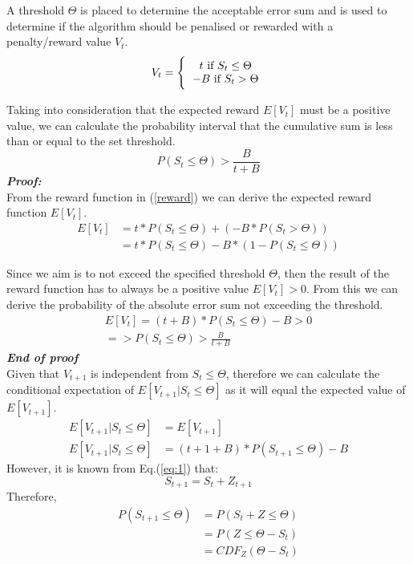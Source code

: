 \documentclass{mpaper}
\begin{document}
A threshold $\Theta$ is placed to determine the acceptable error sum and is used to determine if the algorithm should be penalised or rewarded with a penalty/reward value $V_t$.
\begin{equation}\label{reward}
    V_t = \Bigg\{ \begin{tabular}{c}
                  $t\ \text{if}\ S_t \leq \Theta$ \\
                  $-B\ \text{if}\ S_t > \Theta$
                  \end{tabular}
\end{equation}

Taking into consideration that the expected reward $E[V_t]$ must be a positive value, we can calculate the probability interval that the cumulative sum is less than or equal to the set threshold.
\begin{equation}
    P(S_t \leq \Theta) > \frac{B}{t+B}
\end{equation}
\emph{\textbf{Proof:}} \\
From the reward function in (\ref{reward}) we can derive the expected reward function $E[V_t]$. 
\begin{equation}
\begin{split}
    E[V_t] & = t * P(S_t \leq \Theta) + (-B * P(S_t > \Theta))\\
    & = t * P(S_t \leq \Theta) - B * (1 - P(S_t \leq \Theta))
\end{split}
\end{equation}

Since we aim is to not exceed the specified threshold $\Theta$, then the result of the reward function has to always be a positive value $E[V_t] > 0$. From this we can derive the probability of the absolute error sum not exceeding the threshold.
\begin{multline}
    E[V_t] = (t + B) * P(S_t \leq \Theta) - B > 0\\
    =>  P(S_t \leq \Theta) > \frac{B}{t+B}
\end{multline}
\emph{\textbf{End of proof}}\\

Given that $V_{t+1}$ is independent from $S_t \leq \Theta$, therefore we can calculate the conditional expectation of \newline$E[V_{t+1}|S_t\leq\Theta]$ as it will equal the expected value of $E[V_{t+1}]$.
\begin{align*}
    E[V_{t+1}|S_t\leq\Theta] &= E[V_{t+1}]\\
    E[V_{t+1}|S_t\leq\Theta] &= (t+1+B)*P(S_{t+1}\leq\Theta) - B
\end{align*}
However, it is known from Eq.(\ref{eq:1}) that:
\begin{equation}
    S_{t+1} = S_t + Z_{t+1}
\end{equation}
Therefore, 
\begin{align*}
    P(S_{t+1} \leq \Theta) &= P(S_t + Z \leq \Theta)\\
                           &= P(Z\leq\Theta-S_t)\\
                           &= CDF_{Z}(\Theta - S_t)
\end{align*}
\end{document}
